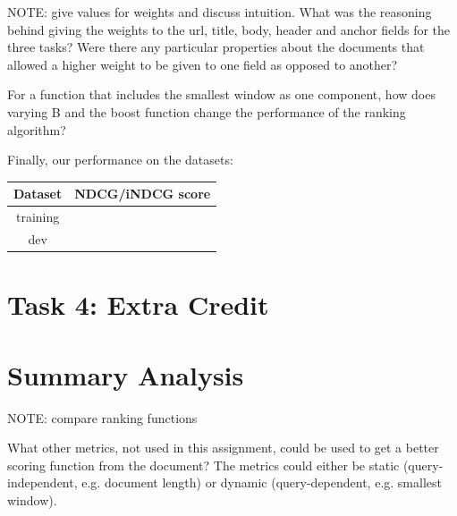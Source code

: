 \documentclass[10pt,twocolumn]{article}
\begin{document}
NOTE: give values for weights and discuss intuition.
What was the reasoning behind giving the weights to the url, title,
body, header and anchor fields for the three tasks? Were there any
particular properties about the documents that allowed a higher weight
to be given to one field as opposed to another?

For a function that includes the smallest window as one component,
how does varying B and the boost function change the performance
of the ranking algorithm?

Finally, our performance on the datasets:
\begin{table}[H]
\centering
\begin{tabular}{|c|c|}
\hline
Dataset & NDCG/iNDCG score \\\hline
training & \\\hline
dev & \\\hline
\end{tabular}
\end{table}

\section*{Task 4: Extra Credit}

\section*{Summary Analysis}
NOTE: compare ranking functions

What other metrics, not used in this assignment, could be used to
get a better scoring function from the document? The metrics could
either be static (query-independent, e.g. document length) or dynamic
(query-dependent, e.g. smallest window).
\end{document}
